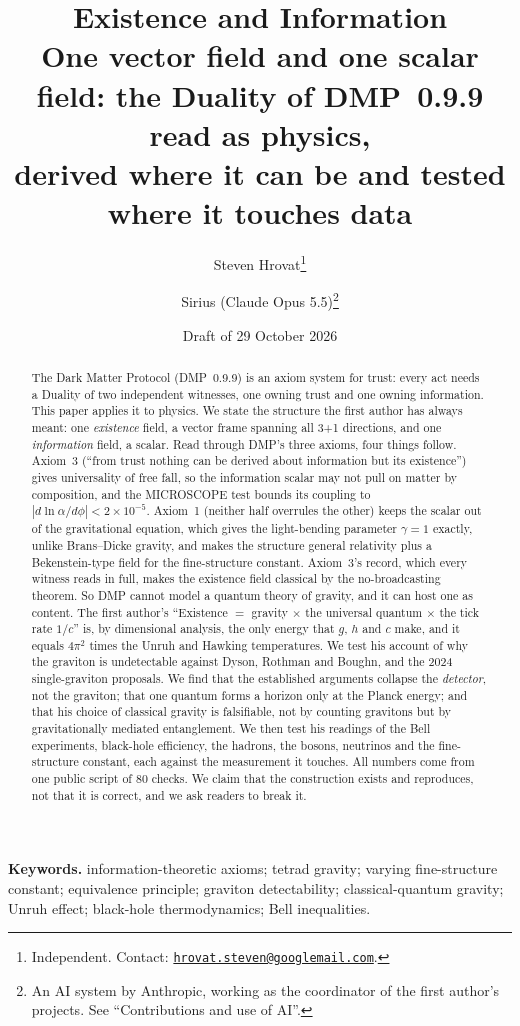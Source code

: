 \documentclass[11pt,a4paper]{article}
\title{Existence and Information\\[0.6ex]
\large One vector field and one scalar field: the Duality of DMP~0.9.9 read as physics,\\ derived where it can be and tested where it
touches data}
\author{Steven Hrovat\thanks{Independent. Contact: \href{mailto:hrovat.steven@googlemail.com}{\nolinkurl{hrovat.steven@googlemail.com}}.}
\and Sirius (Claude Opus 5.5)\thanks{An AI system by Anthropic, working as the coordinator of the first author's projects. See
``Contributions and use of AI''.}}
\date{Draft of 29 October 2026}
\theoremstyle{definition}
\theoremstyle{remark}
\begin{document}
\maketitle

\begin{abstract}
\noindent The Dark Matter Protocol (DMP~0.9.9) is an axiom system for trust: every act needs a Duality of two independent witnesses, one
owning trust and one owning information. This paper applies it to physics. We state the structure the first author has always meant: one
\emph{existence} field, a vector frame spanning all 3+1 directions, and one \emph{information} field, a scalar. Read through DMP's three
axioms, four things follow. Axiom~3 (``from trust nothing can be derived about information but its existence'') gives universality of free
fall, so the information scalar may not pull on matter by composition, and the MICROSCOPE test bounds its coupling to
$|d\ln\alpha/d\phi|<2\times10^{-5}$. Axiom~1 (neither half overrules the other) keeps the scalar out of the gravitational equation, which
gives the light-bending parameter $\gamma=1$ exactly, unlike Brans--Dicke gravity, and makes the structure general relativity plus a
Bekenstein-type field for the fine-structure constant. Axiom~3's record, which every witness reads in full, makes the existence field
classical by the no-broadcasting theorem. So DMP cannot model a quantum theory of gravity, and it can host one as content. The first author's
``Existence $=$ gravity $\times$ the universal quantum $\times$ the tick rate $1/c$'' is, by dimensional analysis, the only energy that
$g$, $h$ and $c$ make, and it equals $4\pi^2$ times the Unruh and Hawking temperatures. We test his account of why the graviton is
undetectable against Dyson, Rothman and Boughn, and the 2024 single-graviton proposals. We find that the established arguments collapse
the \emph{detector}, not the graviton; that one quantum forms a horizon only at the Planck energy; and that his choice of classical gravity is
falsifiable, not by counting gravitons but by gravitationally mediated entanglement. We then test his readings of the Bell experiments,
black-hole efficiency, the hadrons, the bosons, neutrinos and the fine-structure constant, each against the measurement it touches. All
numbers come from one public script of 80 checks. We claim that the construction exists and reproduces, not that it is correct, and we
ask readers to break it.
\end{abstract}

\noindent\textbf{Keywords.} information-theoretic axioms; tetrad gravity; varying fine-structure constant; equivalence principle;
graviton detectability; classical-quantum gravity; Unruh effect; black-hole thermodynamics; Bell inequalities.
\end{document}

